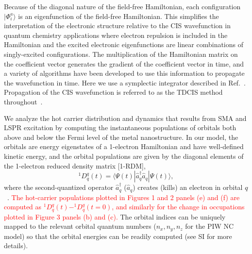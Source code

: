\documentclass[journal=jpclcd,manuscript=article]{achemso}
\begin{document}
Because of the diagonal nature of the field-free Hamiltonian, each configuration $|\Phi_i^a\rangle$ is an eigenfunction
of the field-free Hamiltonian.  This simplifies the interpretation of the electronic structure relative to the CIS 
wavefunction in quantum chemistry applications where electron repulsion is included in the Hamiltonian
and the excited electronic eigenfunctions are linear combinations of singly-excited configurations. 
The multiplication of the Hamiltonian matrix on the coefficient vector generates the gradient of the coefficient vector in time, and
a variety of algorithms have been developed to use this information to propagate the wavefunction in time.  Here we use a symplectic integrator
described in Ref.~.  Propagation of the CIS wavefunction is referred to as the TDCIS method 
throughout~\cite{KKS_JCP_2005,GHP_PRA_2010,DPG_PRL_2011}.

We analyze the hot carrier distribution and dynamics that results from SMA and LSPR excitation by computing the 
instantaneous populations of orbitals both above and below the Fermi level of the metal nanostructure.   
In our model, the orbitals are energy eigenstates of a 1-electron Hamiltonian and have well-defined kinetic energy,
and the orbital populations are given by the diagonal elements of the 1-electron reduced density matrix [1-RDM],
\begin{equation}
^1D^q_q(t) = \langle \Psi(t) | \hat{a}^{\dagger}_q \hat{a}_q | \Psi(t) \rangle,
\end{equation} 
where the second-quantized operator $\hat{a}_q^{\dagger}$ ($\hat{a}_q$) creates (kills) an electron
in orbital $q$~\cite{Szabo}.  \textcolor{red}{The hot-carrier populations plotted in Figures 1 and 2 panels (e) and (f)
are computed as $^1D^q_q(t)-^1D^q_q(t=0)$, and similarly for the change in occupations plotted
in Figure 3 panels (b) and (c).} The orbital indices can be uniquely mapped to the relevant orbital quantum numbers ($n_x, n_y, n_z$ for
the PIW NC model) so that the orbital energies can be readily computed (see SI for more details). 
\end{document}
